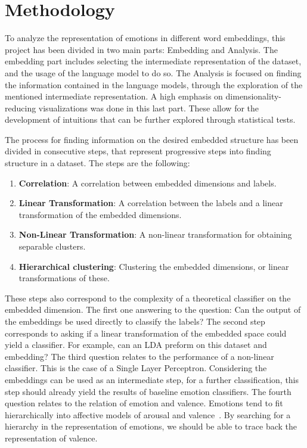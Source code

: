 \chapter{Methodology}\label{chap:Methodology}

To analyze the representation of emotions in different word embeddings, this project has been divided in two main parts: Embedding and Analysis. The embedding part includes selecting the intermediate representation of the dataset, and the usage of the language model to do so. The Analysis is focused on finding the information contained in the language models, through the exploration of the mentioned intermediate representation. A high emphasis on dimensionality-reducing visualizations was done in this last part. These allow for the development of intuitions that can be further explored through statistical tests.

The process for finding information on the desired embedded structure has been divided in consecutive steps, that represent progressive steps into finding structure in a dataset. The steps are the following:

\begin{enumerate}
  \item \textbf{Correlation}: A correlation between embedded dimensions and labels.
  \item \textbf{Linear Transformation}: A correlation between the labels and a linear transformation of the embedded dimensions.
  \item \textbf{Non-Linear Transformation}: A non-linear transformation for obtaining separable clusters.
  \item \textbf{Hierarchical clustering}: Clustering the embedded dimensions, or linear transformations of these.
\end{enumerate}

These steps also correspond to the complexity of a theoretical classifier on the embedded dimension. The first one answering to the question: Can the output of the embeddings be used directly to classify the labels? The second step corresponds to asking if a linear transformation of the embedded space could yield a classifier. For example, can an LDA preform on this dataset and embedding? The third question relates to the performance of a non-linear classifier. This is the case of a Single Layer Perceptron. Considering the embeddings can be used as an intermediate step, for a further classification, this step should already yield the results of baseline emotion classifiers. The fourth question relates to the relation of emotion and valence. Emotions tend to fit hierarchically into affective models of arousal and valence~\cite{barradas2016thesis}. By searching for a hierarchy in the representation of emotions, we should be able to trace back the representation of valence.

